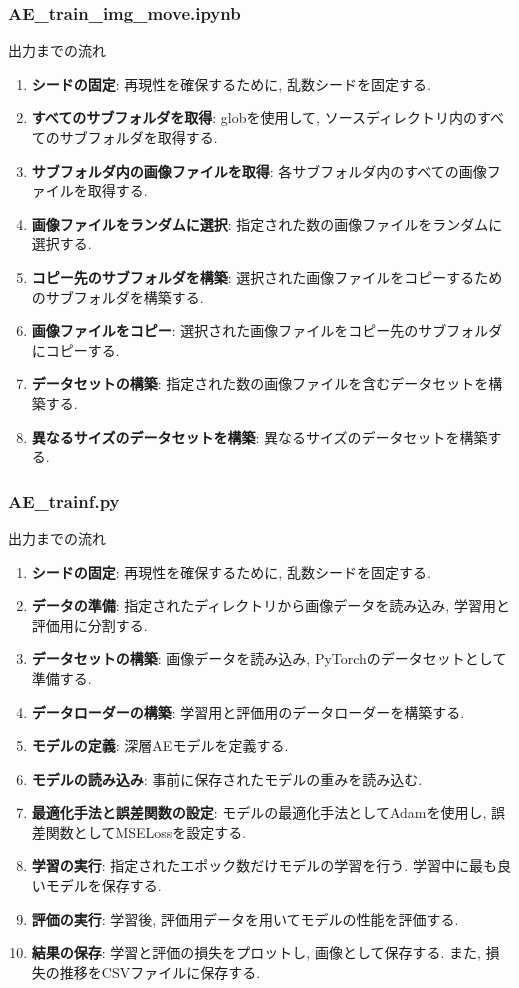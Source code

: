 \documentclass[a4paper, 12pt]{report}
\begin{document}
\subsubsection{\textbf{AE\_train\_img\_move.ipynb}}

出力までの流れ
\begin{enumerate}
    \item \textbf{シードの固定}: 再現性を確保するために, 乱数シードを固定する. 
    \item \textbf{すべてのサブフォルダを取得}: globを使用して, ソースディレクトリ内のすべてのサブフォルダを取得する. 
    \item \textbf{サブフォルダ内の画像ファイルを取得}: 各サブフォルダ内のすべての画像ファイルを取得する. 
    \item \textbf{画像ファイルをランダムに選択}: 指定された数の画像ファイルをランダムに選択する. 
    \item \textbf{コピー先のサブフォルダを構築}: 選択された画像ファイルをコピーするためのサブフォルダを構築する. 
    \item \textbf{画像ファイルをコピー}: 選択された画像ファイルをコピー先のサブフォルダにコピーする. 
    \item \textbf{データセットの構築}: 指定された数の画像ファイルを含むデータセットを構築する. 
    \item \textbf{異なるサイズのデータセットを構築}: 異なるサイズのデータセットを構築する. 
\end{enumerate}

\subsubsection{\textbf{AE\_trainf.py}}

出力までの流れ
\begin{enumerate}
    \item \textbf{シードの固定}: 再現性を確保するために, 乱数シードを固定する. 
    \item \textbf{データの準備}: 指定されたディレクトリから画像データを読み込み, 学習用と評価用に分割する. 
    \item \textbf{データセットの構築}: 画像データを読み込み, PyTorchのデータセットとして準備する. 
    \item \textbf{データローダーの構築}: 学習用と評価用のデータローダーを構築する. 
    \item \textbf{モデルの定義}: 深層AEモデルを定義する. 
    \item \textbf{モデルの読み込み}: 事前に保存されたモデルの重みを読み込む. 
    \item \textbf{最適化手法と誤差関数の設定}: モデルの最適化手法としてAdamを使用し, 誤差関数としてMSELossを設定する. 
    \item \textbf{学習の実行}: 指定されたエポック数だけモデルの学習を行う. 学習中に最も良いモデルを保存する. 
    \item \textbf{評価の実行}: 学習後, 評価用データを用いてモデルの性能を評価する. 
    \item \textbf{結果の保存}: 学習と評価の損失をプロットし, 画像として保存する. また, 損失の推移をCSVファイルに保存する. 
\end{enumerate}
\end{document}
